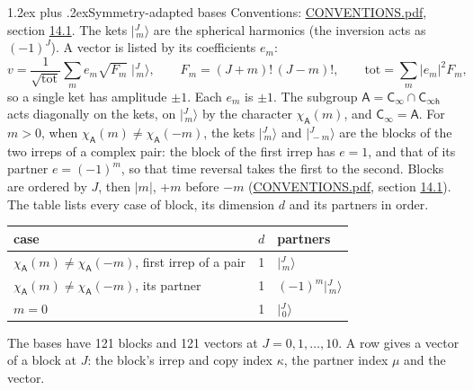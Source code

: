 \documentclass[10pt,a4paper]{article}
\makeatletter
\renewcommand\section{\@startsection{section}{1}{\z@}{-3ex plus -1ex minus -.2ex}%
  {1.2ex plus .2ex}{\normalfont\large\sffamily\bfseries\color{parttitle}}}
\numberwithin{equation}{section}
\newcommand{\grp}[1]{\mathsf{#1}}
\newcommand{\chiA}{\chi_{\grp{A}}}
\newcommand{\mult}{\kappa}
\newcommand{\intx}{\mu}
\newcommand{\jm}[2]{\bigl\lvert{}^{#1}_{\,#2}\bigr\rangle}
\makeatother
\begin{document}
\section{Symmetry-adapted bases}\label{s:bases}
Conventions: \href{../../CONVENTIONS.pdf}{CONVENTIONS.pdf}, section \href{../../CONVENTIONS.pdf\#conv.14.1}{14.1}.
\leavevmode\label{n:index.m}\label{n:vector.ket}The kets $\jm{J}{m}$ are the spherical harmonics (the inversion acts as $(-1)^J$). \label{n:index.ketcoefficient}\label{n:vector.basis.symmetry}\label{n:index.ketweight}\label{n:index.total}A vector is listed by its coefficients $e_m$:
\begin{equation}\label{e:ket}v = \frac{1}{\sqrt{\mathrm{tot}}}\sum_m e_m\sqrt{F_m}\;\jm{J}{m},\qquad F_m = (J+m)!\,(J-m)!,\qquad \mathrm{tot} = \sum_m |e_m|^2F_m,\end{equation}
so a single ket has amplitude $\pm1$. Each $e_m$ is $\pm1$.
\leavevmode\label{n:group.A}\label{n:function.character.abelian}The subgroup $\grp{A} = \grp{C_{\infty}}\cap\grp{C_{\infty h}}$ acts diagonally on the kets, on $\jm{J}{m}$ by the character $\chiA(m)$, and $\grp{C_{\infty}} = \grp{A}$. For $m > 0$, when $\chiA(m) \ne \chiA(-m)$, the kets $\jm{J}{m}$ and $\jm{J}{-m}$ are the blocks of the two irreps of a complex pair: the block of the first irrep has $e = 1$, and that of its partner $e = (-1)^m$, so that time reversal takes the first to the second. Blocks are ordered by $J$, then $|m|$, $+m$ before $-m$ (\href{../../CONVENTIONS.pdf}{CONVENTIONS.pdf}, section \href{../../CONVENTIONS.pdf\#conv.14.1}{14.1}).
\leavevmode\label{n:head.case}\label{n:head.partners}The table lists every case of block, its dimension $d$ and its partners in order.
\begin{center}\begin{tabular}{@{}lrl@{}}\toprule
case & $d$ & partners\\\midrule
$\chiA(m) \ne \chiA(-m)$, first irrep of a pair & 1 & $\jm{J}{m}$\\
$\chiA(m) \ne \chiA(-m)$, its partner & 1 & $(-1)^m\jm{J}{m}$\\
$m = 0$ & 1 & $\jm{J}{0}$\\
\bottomrule\end{tabular}\end{center}
The bases have 121 blocks and 121 vectors at $J = 0, 1, \dots, 10$. \label{n:index.copy}\label{n:head.irrep}\label{n:head.vector}A row gives a vector of a block at $J$: the block's irrep and copy index $\mult$, the partner index $\intx$ and the vector.
\end{document}
